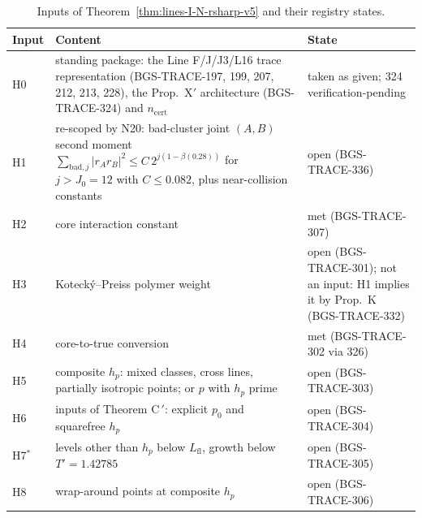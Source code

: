 \begin{table}[ht]
\centering\small
\caption{Inputs of Theorem~\ref{thm:lines-I-N-rsharp-v5} and their registry states.}
\label{tab:lines-I-N-inputs}
\begin{tabular}{@{}>{\raggedright\arraybackslash}p{}>{\raggedright\arraybackslash}p{}>{\raggedright\arraybackslash}p{}@{}}
\toprule
Input & Content & State\\
\midrule
H0 & standing package: the Line F/J/J3/L16 trace representation (BGS-TRACE-197, 199, 207, 212, 213, 228), the Prop.~X\('\) architecture (BGS-TRACE-324) and \(n_{\mathrm{cert}}\) & taken as given; 324 verification-pending\\
H1 & re-scoped by N20: bad-cluster joint \((A,B)\) second moment \(\sum_{\mathrm{bad},j}\lvert r_Ar_B\rvert^2\le C\,2^{j(1-\beta(0.28))}\) for \(j>J_0=12\) with \(C\le0.082\), plus near-collision constants & open (BGS-TRACE-336)\\
H2 & core interaction constant & met (BGS-TRACE-307)\\
H3 & Kotecký--Preiss polymer weight & open (BGS-TRACE-301); not an input: H1 implies it by Prop.~K (BGS-TRACE-332)\\
H4 & core-to-true conversion & met (BGS-TRACE-302 via 326)\\
H5 & composite \(h_p\): mixed classes, cross lines, partially isotropic points; or \(p\) with \(h_p\) prime & open (BGS-TRACE-303)\\
H6 & inputs of Theorem C\(\,'\): explicit \(p_0\) and squarefree \(h_p\) & open (BGS-TRACE-304)\\
H7\(^*\) & levels other than \(h_p\) below \(L_{\mathrm{fl}}\), growth below \(T'=1.42785\) & open (BGS-TRACE-305)\\
H8 & wrap-around points at composite \(h_p\) & open (BGS-TRACE-306)\\
\bottomrule
\end{tabular}
\end{table}

